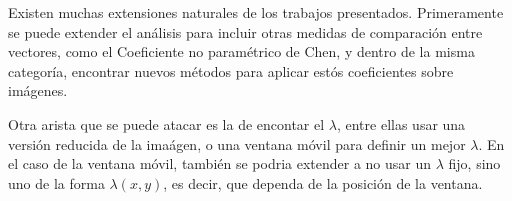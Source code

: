     Existen muchas extensiones naturales de los trabajos presentados. Primeramente se puede extender el an\'alisis para incluir otras medidas de comparaci\'on entre vectores, como el Coeficiente no paramétrico de Chen, y dentro de la misma categor\'ia, encontrar nuevos m\'etodos para aplicar est\'os coeficientes sobre im\'agenes. 

    Otra arista que se puede atacar es la de encontar el $\lambda$, entre ellas usar una versi\'on reducida de la ima\'agen, o una ventana m\'ovil para definir un mejor $\lambda$. En el caso de la ventana m\'ovil, tambi\'en se podria extender a no usar un $\lambda$ fijo, sino uno de la forma $\lambda(x,y)$, es decir, que dependa de la posici\'on de la ventana. 

